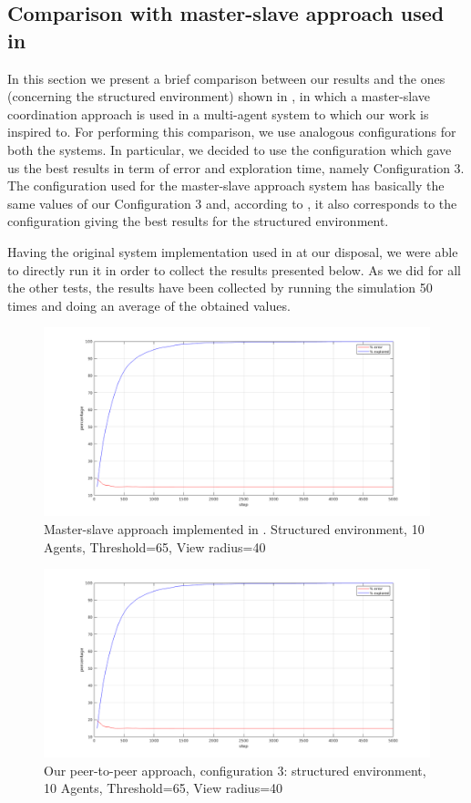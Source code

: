 \documentclass[a4paper, 10pt, conference]{ieeeconf}      %
\begin{document}
\subsection{Comparison with master-slave approach used in \cite{tavaresgaspar}}
In this section we present a brief comparison between our results and the ones (concerning the structured environment) shown in \cite{tavaresgaspar}, in which a master-slave coordination approach is used in a multi-agent system to which our work is inspired to. For performing this comparison, we use analogous configurations for both the systems. In particular, we decided to use the configuration which gave us the best results in term of error and exploration time, namely Configuration 3. The configuration used for the master-slave approach system has basically the same values of our Configuration 3 and, according to \cite{tavaresgaspar}, it also corresponds to the configuration giving the best results for the structured environment. 

Having the original system implementation used in \cite{tavaresgaspar} at our disposal, we were able to directly run it in order to collect the results presented below. As we did for all the other tests, the results have been collected by running the simulation 50 times and doing an average of the obtained values. 

\begin{figure}[H]
	\centering
	\includegraphics[width=1\linewidth]{img/exploration-original.png}
	\caption{Master-slave approach implemented in \cite{tavaresgaspar}. Structured environment, 10 Agents, Threshold=65, View radius=40}
	\label{fig:results-original}
\end{figure}
\begin{figure}[H]
	\centering
	\includegraphics[width=1\linewidth]{img/exploration-original.png}
	\caption{Our peer-to-peer approach, configuration 3: structured environment, 10 Agents, Threshold=65, View radius=40}
	\label{fig:results-ours}
\end{figure}
\end{document}
